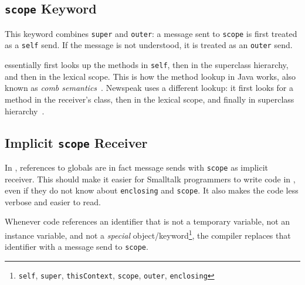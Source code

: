 

\subsection{\texttt{scope} Keyword}
This keyword combines \texttt{super} and \texttt{outer}: a message sent to \texttt{scope} is first treated as a \texttt{self} send. If the message is not understood, it is treated as an \texttt{outer} send.

\msname essentially first looks up the methods in \texttt{self}, then in the superclass hierarchy, and then in the lexical scope. This is how the method lookup in Java works, also known as \emph{comb semantics}~\cite{bracha2007interaction}. Newspeak uses a different lookup: it first looks for a method in the receiver's class, then in the lexical scope, and finally in superclass hierarchy~\cite{bracha:modules_as_objects}.


\subsection{Implicit \texttt{scope} Receiver}
In \msname, references to globals are in fact message sends with \texttt{scope} as implicit receiver. This should make it easier for Smalltalk programmers to write code in \msname, even if they do not know about \texttt{enclosing} and \texttt{scope}. It also makes the code less verbose and easier to read.

Whenever code references an identifier that is not a temporary variable, not an instance variable, and not a \emph{special} object/keyword\footnote{\texttt{self}, \texttt{super}, \texttt{thisContext}, \texttt{scope}, \texttt{outer}, \texttt{enclosing}}, the compiler replaces that identifier with a message send to \texttt{scope}.

